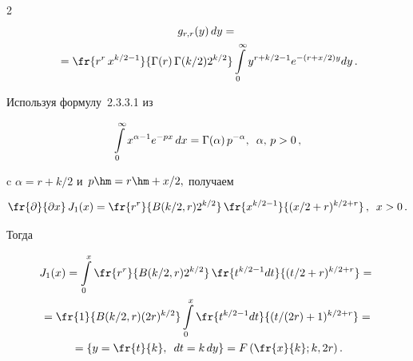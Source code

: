 \begin{multicols}{2}
\begin{multline*}
g_{r,r}(y)\,dy = {}\\


{}=


\fr{r^r\,x^{k/2-1}}{\Gamma(r)\,\Gamma(k/2)2^{k/2}}


\int\limits^{\infty}_{0} y^{r+k/2-1}e^{-(r+x/2)y}dy\,.


\end{multline*}








Используя формулу~2.3.3.1 из~\cite[с.~259]{Prudnikov}


\begin{equation*}


\int\limits^{\infty}_{0} x^{\alpha-1}e^{-px}\,dx=


\Gamma(\alpha)\,p^{-\alpha}, \enskip


\alpha,\,p > 0\,,


\end{equation*}


c $\alpha=r+k/2$ и~$p\hm=r\hm+x/2,$ получаем


\begin{equation*}


\fr{\partial}{\partial x}\,J_1(x) = \fr{r^r}{B(k/2,r)2^{k/2}}\,


\fr{x^{k/2-1}}{(x/2+r)^{k/2+r}}\,, \enskip x>0\,.


\end{equation*}


Тогда


\begin{multline}


\label{int1}


J_1(x) = \int\limits_{0}^{x} \fr{r^r}{B(k/2,r)2^{k/2}}\,


\fr{t^{k/2-1}dt}{(t/2+r)^{k/2+r}}  ={}\\


{}= \fr{1}{B(k/2,r)(2r)^{k/2}}  


\int\limits_{0}^{x}\fr{t^{k/2-1}dt}{(t/(2r)+1)^{k/2+r}} = {}\\


{}= \left\{  y = \fr{t}{k}, \enskip dt = k\,dy  \right\} = 


F\left(\fr{x}{k};k,2r\right).


\end{multline}









\end{multicols}
